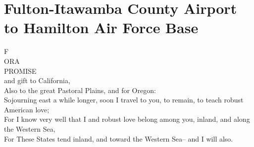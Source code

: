 \documentclass[smalldemyvopaper,11pt,twoside,onecolumn,openright,extrafontsizes]{memoir}
\begin{document}
\chapter{Fulton-Itawamba County Airport to Hamilton Air Force Base}
F
\\ORA
\\PROMISE
\\and gift to California,
\\Also to the great Pastoral Plains, and for Oregon:
\\Sojourning east a while longer, soon I travel to you, to remain, to teach robust American love;
\\For I know very well that I and robust love belong among you, inland, and along the Western Sea,
\\For These States tend inland, and toward the Western Sea-- and I will also.
\end{document}
